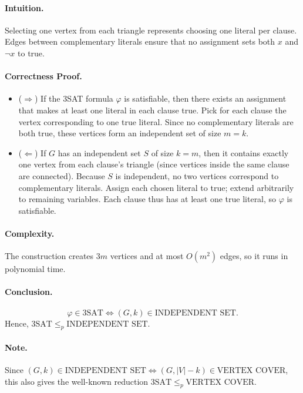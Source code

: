 \documentclass[9pt]{extarticle}
\begin{document}
\paragraph{Intuition.}
Selecting one vertex from each triangle represents choosing one literal per clause.
Edges between complementary literals ensure that no assignment sets both \( x \) and \( \neg x \) to true.

\paragraph{Correctness Proof.}
\begin{itemize}
    \item (\(\Rightarrow\)) If the 3SAT formula \(\varphi\) is satisfiable, then there exists an assignment that makes at least one literal in each clause true.
    Pick for each clause the vertex corresponding to one true literal. Since no complementary literals are both true, these vertices form an independent set of size \( m = k \).

    \item (\(\Leftarrow\)) If \( G \) has an independent set \( S \) of size \( k = m \), then it contains exactly one vertex from each clause’s triangle (since vertices inside the same clause are connected). 
    Because \( S \) is independent, no two vertices correspond to complementary literals. 
    Assign each chosen literal to true; extend arbitrarily to remaining variables.
    Each clause thus has at least one true literal, so \(\varphi\) is satisfiable.
\end{itemize}

\paragraph{Complexity.}
The construction creates \( 3m \) vertices and at most \( O(m^2) \) edges, so it runs in polynomial time.

\paragraph{Conclusion.}
\[
\varphi \in 3\text{SAT} \iff (G, k) \in \text{INDEPENDENT SET}.
\]
Hence, \( 3\text{SAT} \leq_p \text{INDEPENDENT SET} \).

\paragraph{Note.}
Since \((G, k) \in \text{INDEPENDENT SET} \iff (G, |V|-k) \in \text{VERTEX COVER}\),
this also gives the well-known reduction \( 3\text{SAT} \leq_p \text{VERTEX COVER} \).
\end{document}
